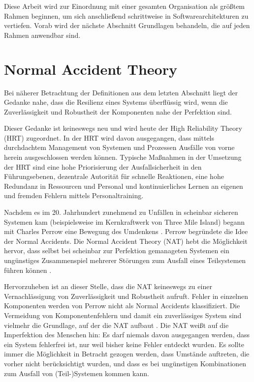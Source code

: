 \documentclass[]{lni}
\begin{document}
Diese Arbeit wird zur Einordnung mit einer gesamten Organisation als größtem Rahmen beginnen, um sich anschließend schrittweise in Softwarearchitekturen zu vertiefen. Vorab wird der nächste Abschnitt Grundlagen behandeln, die auf jeden Rahmen anwendbar sind.

\section*{Normal Accident Theory} \label{placement-NAT}

Bei näherer Betrachtung der Definitionen aus dem letzten Abschnitt liegt der Gedanke nahe, dass die Resilienz eines Systems überflüssig wird, wenn die Zuverlässigkeit und Robustheit der Komponenten nahe der Perfektion sind. 

Dieser Gedanke ist keineswegs neu und wird heute der High Reliability Theory (HRT) zugeordnet. In der HRT wird davon ausgegangen, dass mittels durchdachtem Management von Systemen und Prozessen Ausfälle von vorne herein ausgeschlossen werden können. Typische Maßnahmen in der Umsetzung der HRT sind eine hohe Priorisierung der Ausfallsicherheit in den Führungsebenen, dezentrale Autorität für schnelle Reaktionen, eine hohe Redundanz in Ressourcen und Personal und kontinuierliches Lernen an eigenen und fremden Fehlern mittels Personaltraining. \cite[100]{ThierryMeyer.2022}

Nachdem es im 20. Jahrhundert zunehmend zu Unfällen in scheinbar sicheren Systemen kam (beispielsweise im Kernkraftwerk von Three Mile Island) begann mit Charles Perrow eine Bewegung des Umdenkens \cite[9]{Perrow.2004}. Perrow begründete die Idee der \glqq Normal Accidents\grqq{}. Die Normal Accident Theory (NAT) hebt die Möglichkeit hervor, dass selbst bei scheinbar zur Perfektion gemanageten Systemen ein ungünstiges Zusammenspiel mehrerer Störungen zum Ausfall eines Teilsystemen führen können \cite[4]{CharlesPerrow.2000}. 

Hervorzuheben ist an dieser Stelle, dass die NAT keineswegs zu einer Vernachlässigung von Zuverlässigkeit und Robustheit aufruft. Fehler in einzelnen Komponenten werden von Perrow nicht als \glqq Normal Accidents\grqq{} klassifiziert. Die Vermeidung von Komponentenfehlern und damit ein zuverlässiges System sind vielmehr die Grundlage, auf der die NAT aufbaut \cite{Perrow.2004}. Die NAT weißt auf die Imperfektion des Menschen hin: Es darf niemals davon ausgegangen werden, dass ein System fehlerfrei ist, nur weil bisher keine Fehler entdeckt wurden. Es sollte immer die Möglichkeit in Betracht gezogen werden, dass Umstände auftreten, die vorher nicht berücksichtigt wurden, und dass es bei ungünstigen Kombinationen zum Ausfall von (Teil-)Systemen kommen kann.
\end{document}
